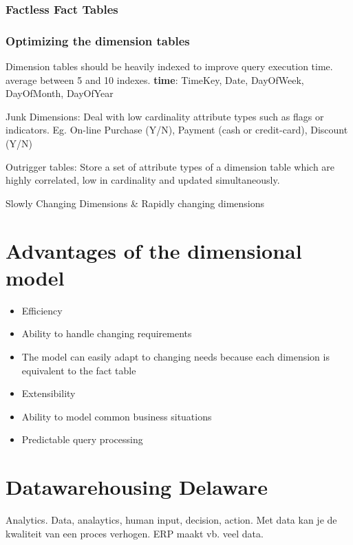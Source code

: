\documentclass{report}
\begin{document}
\subsubsection{Factless Fact Tables}
\subsubsection{Optimizing the dimension tables}
Dimension tables should be heavily indexed to improve query execution time. average between 5 and 10 indexes. \textbf{time}: TimeKey, Date, DayOfWeek, DayOfMonth, DayOfYear

Junk Dimensions: Deal with low cardinality attribute types such as flags or indicators. Eg. On-line Purchase (Y/N), Payment (cash or credit-card), Discount (Y/N)

Outrigger tables: Store a set of attribute types of a dimension table which are highly correlated, low in cardinality and updated simultaneously.

Slowly Changing Dimensions \& Rapidly changing dimensions

\section{Advantages of the dimensional model}
\begin{itemize}
    \item Efficiency
    \item Ability to handle changing requirements
    \item The model can easily adapt to changing needs because each dimension is equivalent to the fact table
    \item Extensibility
    \item Ability to model common business situations
    \item Predictable query processing
\end{itemize}
    \section{Datawarehousing Delaware}
Analytics. Data, analaytics, human input, decision, action.
Met data kan je de kwaliteit van een proces verhogen. ERP maakt vb. veel data.
\end{document}
